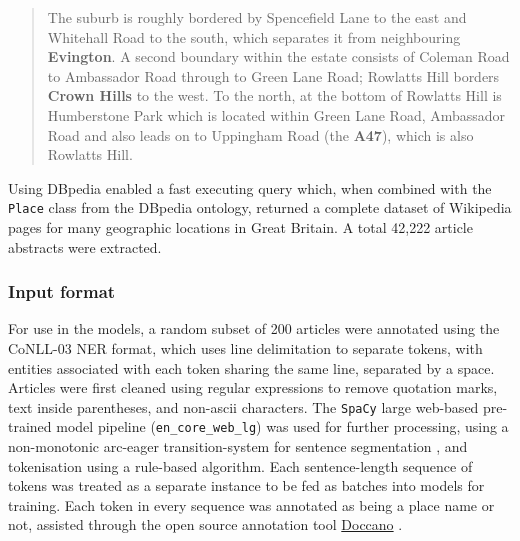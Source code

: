 \documentclass[]{interact}
\theoremstyle{plain}%
\theoremstyle{definition}
\theoremstyle{remark}
\begin{document}
\begin{quote}
The suburb is roughly bordered by Spencefield Lane to the east and
Whitehall Road to the south, which separates it from neighbouring
\textbf{Evington}. A second boundary within the estate consists of
Coleman Road to Ambassador Road through to Green Lane Road; Rowlatts
Hill borders \textbf{Crown Hills} to the west. To the north, at the
bottom of Rowlatts Hill is Humberstone Park which is located within
Green Lane Road, Ambassador Road and also leads on to Uppingham Road
(the \textbf{A47}), which is also Rowlatts Hill.
\end{quote}

Using DBpedia enabled a fast executing query which, when combined with
the \texttt{Place} class from the DBpedia ontology, returned a complete
dataset of Wikipedia pages for many geographic locations in Great
Britain. A total 42,222 article abstracts were extracted.

\hypertarget{input-format}{%
\subsubsection{Input format}\label{input-format}}

For use in the models, a random subset of 200 articles were annotated
using the CoNLL-03 NER format, which uses line delimitation to separate
tokens, with entities associated with each token sharing the same line,
separated by a space. Articles were first cleaned using regular
expressions to remove quotation marks, text inside parentheses, and
non-ascii characters. The \texttt{SpaCy} large web-based pre-trained
model pipeline (\texttt{en\_core\_web\_lg}) was used for further
processing, using a non-monotonic arc-eager transition-system for
sentence segmentation \citep{honnibal2015}, and tokenisation using a
rule-based algorithm. Each sentence-length sequence of tokens was
treated as a separate instance to be fed as batches into models for
training. Each token in every sequence was annotated as being a place
name or not, assisted through the open source annotation tool
\href{https://github.com/doccano/doccano}{Doccano} \citep{nakayama2018}.
\end{document}
